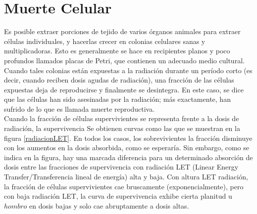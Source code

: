 \documentclass[]{article}
\begin{document}
\section{Muerte Celular}

Es posible extraer porciones de tejido de varios órganos animales para extraer células individuales, y hacerlas crecer en colonias celulares sanas y multiplicadoras. Esto es generalmente se hace en recipientes planos y poco profundos llamados placas de Petri, que contienen un adecuado medio cultural. Cuando tales colonias están expuestas a la radiación durante un período corto (es decir, cuando reciben dosis agudas de radiación), una fracción de las células expuestas deja de reproducirse y finalmente se desintegra. En este caso, se dice que las células han sido asesinadas por la radiación; más exactamente, han sufrido de lo que es llamada muerte reproductiva.\\

Cuando la fracción de células supervivientes se representa frente a la dosis de radiación, la supervivencia Se obtienen curvas como las que se muestran en la figura \ref{radiacionLET}. En todos los casos, los sobrevivientes la fracción disminuye con los aumentos en la dosis absorbida, como se esperaría. Sin embargo, como se indica en la figura, hay una marcada diferencia para un determinado absorción de dosis entre las fracciones de supervivencia con radiación LET (Linear Energy Transfer/Transferencia lineal de energía) alta y baja. Con altura LET radiación, la fracción de células supervivientes cae bruscamente (exponencialmente), pero con baja radiación LET, la curva de supervivencia exhibe cierta planitud u $hombro$ en dosis bajas y solo cae abruptamente a dosis altas.\\
\end{document}
